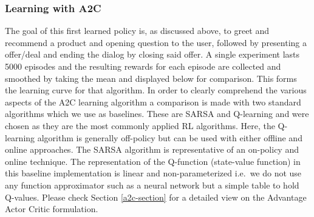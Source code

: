 \documentclass[12pt]{extarticle}
\numberwithin{equation}{section}
\begin{document}
	\subsubsection{Learning with A2C}
	The goal of this first learned policy is, as discussed above, to greet and recommend a product and opening question to the user, followed by presenting a offer/deal and ending the dialog by closing said offer. A single experiment lasts 5000 episodes and the resulting rewards for each episode are collected and smoothed by taking the mean and displayed below for comparison. This forms the learning curve for that algorithm. In order to clearly comprehend the various aspects of the A2C learning algorithm a comparison is made with two standard algorithms which we use as baselines. These are SARSA and Q-learning \cite{Sutton-introRL} and were chosen as they are the most commonly applied RL algorithms. Here, the Q-learning algorithm is generally off-policy but can be used with either offline and online approaches. The SARSA algorithm is representative of an on-policy and online technique. The representation of the Q-function (state-value function) in this baseline implementation is linear and non-parameterized i.e.\ we do not use any function approximator such as a neural network but a simple table to hold Q-values. Please check Section \ref{a2c-section} for a detailed view on the Advantage Actor Critic formulation.
	
\end{document}
